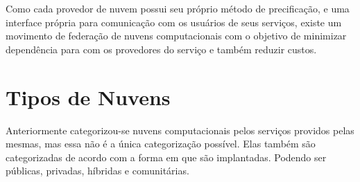 Como cada provedor de nuvem possui seu próprio método de precificação, e uma interface própria para comunicação com os usuários de seus serviços, existe um movimento de federação de nuvens computacionais com o objetivo de minimizar dependência para com os provedores do serviço e também reduzir custos.

\section{Tipos de Nuvens}

Anteriormente categorizou-se nuvens computacionais pelos serviços providos pelas mesmas, mas essa não é a única categorização possível. Elas também são categorizadas de acordo com a forma em que são implantadas. Podendo ser públicas, privadas, híbridas e comunitárias.
